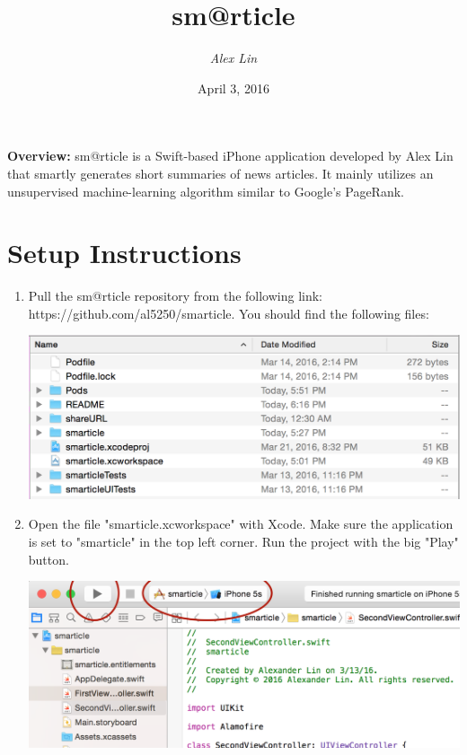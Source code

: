 \documentclass[11pt, margin=1in]{article}
\begin{document}
\title{\textbf{sm@rticle}}
\author{\textit{Alex Lin}}
\date{April 3, 2016}
\maketitle

\noindent 
\textbf{Overview:} sm@rticle is a Swift-based iPhone application developed by Alex Lin that smartly generates short summaries of news articles.  It mainly utilizes an unsupervised machine-learning algorithm similar to Google's PageRank.  


\section{Setup Instructions}
\begin{enumerate}

\item
Pull the sm@rticle repository from the following link: https://github.com/al5250/smarticle.  You should find the following files:
\begin{center}
\includegraphics[scale=0.7]{1.jpg}
\end{center}

\item
Open the file "smarticle.xcworkspace" with Xcode.  Make sure the application is set to "smarticle" in the top left corner.  Run the project with the big "Play" button.     
\begin{center}
\includegraphics[scale=0.7]{2.jpg}
\end{center}


\end{enumerate}
\end{document}
